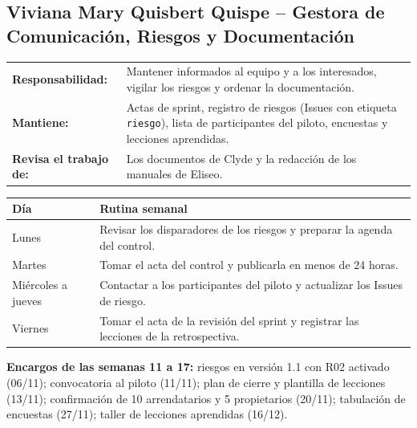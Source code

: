 \documentclass[11pt,a4paper]{article}
\begin{document}
\subsection{Viviana Mary Quisbert Quispe -- Gestora de Comunicación, Riesgos y Documentación}
{\small
\noindent\begin{tabularx}{\textwidth}{@{}P{3.4cm} L@{}}
\toprule
\textbf{Responsabilidad:} & Mantener informados al equipo y a los interesados, vigilar los riesgos y ordenar la documentación. \\
\textbf{Mantiene:} & Actas de sprint, registro de riesgos (Issues con etiqueta \texttt{riesgo}), lista de participantes del piloto, encuestas y lecciones aprendidas. \\
\textbf{Revisa el trabajo de:} & Los documentos de Clyde y la redacción de los manuales de Eliseo. \\
\bottomrule
\end{tabularx}
}

\vspace{0.1cm}
{\small
{}
\noindent\begin{tabularx}{\textwidth}{@{}P{2.4cm} L@{}}
\toprule
{}
\textbf{Día} & \textbf{Rutina semanal} \\
\midrule
Lunes & Revisar los disparadores de los riesgos y preparar la agenda del control. \\
Martes & Tomar el acta del control y publicarla en menos de 24 horas. \\
Miércoles a jueves & Contactar a los participantes del piloto y actualizar los Issues de riesgo. \\
Viernes & Tomar el acta de la revisión del sprint y registrar las lecciones de la retrospectiva. \\
\bottomrule
\end{tabularx}
}

\vspace{0.1cm}
\noindent\textbf{Encargos de las semanas 11 a 17:} riesgos en versión 1.1 con R02 activado (06/11); convocatoria al piloto (11/11); plan de cierre y plantilla de lecciones (13/11); confirmación de 10 arrendatarios y 5 propietarios (20/11); tabulación de encuestas (27/11); taller de lecciones aprendidas (16/12).
\end{document}
